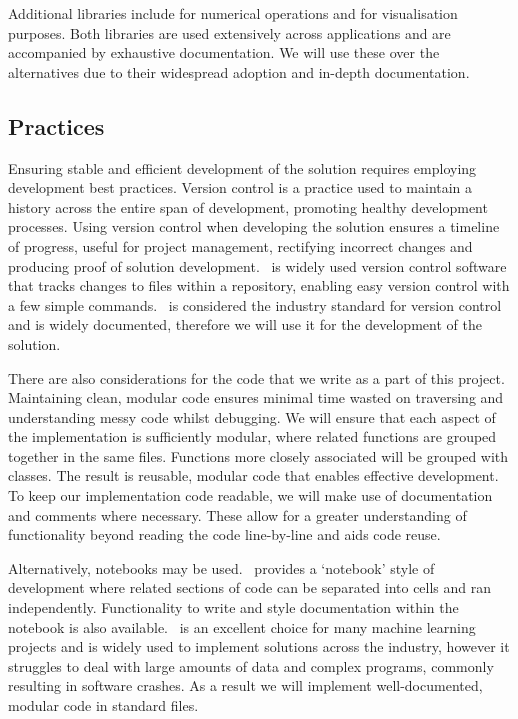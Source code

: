 Additional  libraries include  for numerical operations and  for visualisation purposes. Both libraries are used extensively across  applications and are accompanied by exhaustive documentation. We will use these over the alternatives due to their widespread adoption and in-depth documentation.

\subsection{Practices}
Ensuring stable and efficient development of the solution requires employing development best practices. Version control is a practice used to maintain a history across the entire span of development, promoting healthy development processes. Using version control when developing the solution ensures a timeline of progress, useful for project management, rectifying incorrect changes and producing proof of solution development.\  is widely used version control software that tracks changes to files within a repository, enabling easy version control with a few simple commands.\  is considered the industry standard for version control and is widely documented, therefore we will use it for the development of the solution.

There are also considerations for the code that we write as a part of this project. Maintaining clean, modular code ensures minimal time wasted on traversing and understanding messy code whilst debugging. We will ensure that each aspect of the implementation is sufficiently modular, where related functions are grouped together in the same  files. Functions more closely associated will be grouped with  classes. The result is reusable, modular code that enables effective development. To keep our implementation code readable, we will make use of documentation and comments where necessary. These allow for a greater understanding of functionality beyond reading the code line-by-line and aids code reuse. 

Alternatively,  notebooks may be used.\  provides a `notebook' style of development where related sections of code can be separated into cells and ran independently. Functionality to write and style documentation within the notebook is also available.\  is an excellent choice for many machine learning projects and is widely used to implement solutions across the industry, however it struggles to deal with large amounts of data and complex programs, commonly resulting in software crashes. As a result we will implement well-documented, modular code in standard  files.

